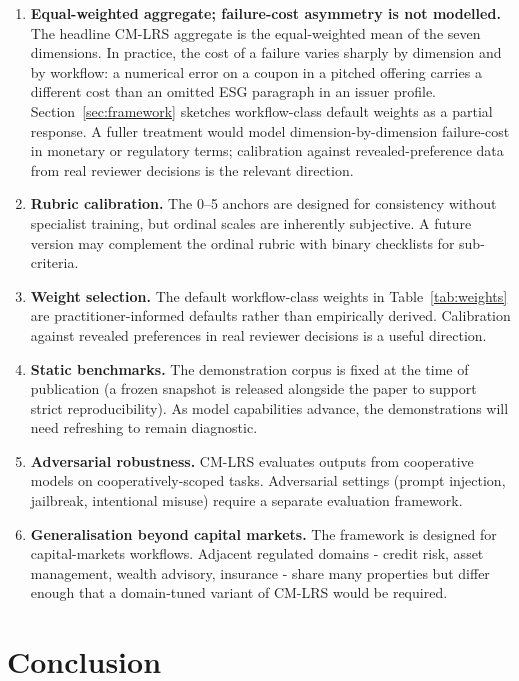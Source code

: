 \documentclass[11pt]{article}
\begin{document}
\begin{enumerate}[leftmargin=*,itemsep=0.2em]
\item \textbf{Equal-weighted aggregate; failure-cost asymmetry is not modelled.} The headline CM-LRS aggregate is the equal-weighted mean of the seven dimensions. In practice, the cost of a failure varies sharply by dimension and by workflow: a numerical error on a coupon in a pitched offering carries a different cost than an omitted ESG paragraph in an issuer profile. Section~\ref{sec:framework} sketches workflow-class default weights as a partial response. A fuller treatment would model dimension-by-dimension failure-cost in monetary or regulatory terms; calibration against revealed-preference data from real reviewer decisions is the relevant direction.
\item \textbf{Rubric calibration.} The 0--5 anchors are designed for consistency without specialist training, but ordinal scales are inherently subjective. A future version may complement the ordinal rubric with binary checklists for sub-criteria.
\item \textbf{Weight selection.} The default workflow-class weights in Table~\ref{tab:weights} are practitioner-informed defaults rather than empirically derived. Calibration against revealed preferences in real reviewer decisions is a useful direction.
\item \textbf{Static benchmarks.} The demonstration corpus is fixed at the time of publication (a frozen snapshot is released alongside the paper to support strict reproducibility). As model capabilities advance, the demonstrations will need refreshing to remain diagnostic.
\item \textbf{Adversarial robustness.} CM-LRS evaluates outputs from cooperative models on cooperatively-scoped tasks. Adversarial settings (prompt injection, jailbreak, intentional misuse) require a separate evaluation framework.
\item \textbf{Generalisation beyond capital markets.} The framework is designed for capital-markets workflows. Adjacent regulated domains - credit risk, asset management, wealth advisory, insurance - share many properties but differ enough that a domain-tuned variant of CM-LRS would be required.
\end{enumerate}

\section{Conclusion}
\label{sec:conclusion}
\end{document}
